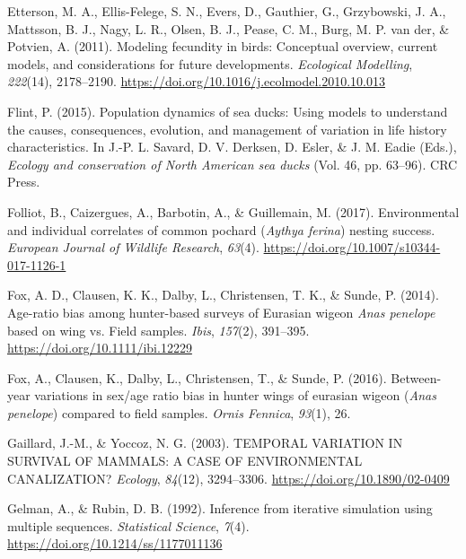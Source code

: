 \documentclass[
  english,
]{article}
\newlength{\cslhangindent}
\newlength{\cslentryspacingunit} %
\newenvironment{CSLReferences}[2] %
 {%
  \setlength{\parindent}{0pt}
  \ifodd #1
  \let\oldpar\par
  \def\par{\hangindent=\cslhangindent\oldpar}
  \fi
  \setlength{\parskip}{#2\cslentryspacingunit}
 }%
 {}
\begin{document}
\begin{CSLReferences}{1}{0}
\leavevmode{}%
Etterson, M. A., Ellis-Felege, S. N., Evers, D., Gauthier, G., Grzybowski, J. A., Mattsson, B. J., Nagy, L. R., Olsen, B. J., Pease, C. M., Burg, M. P. van der, \& Potvien, A. (2011). Modeling fecundity in birds: Conceptual overview, current models, and considerations for future developments. \emph{Ecological Modelling}, \emph{222}(14), 2178--2190. \url{https://doi.org/10.1016/j.ecolmodel.2010.10.013}

\leavevmode{}%
Flint, P. (2015). Population dynamics of sea ducks: Using models to understand the causes, consequences, evolution, and management of variation in life history characteristics. In J.-P. L. Savard, D. V. Derksen, D. Esler, \& J. M. Eadie (Eds.), \emph{Ecology and conservation of {N}orth {A}merican sea ducks} (Vol. 46, pp. 63--96). CRC Press.

\leavevmode{}%
Folliot, B., Caizergues, A., Barbotin, A., \& Guillemain, M. (2017). Environmental and individual correlates of common pochard (\emph{{A}ythya ferina}) nesting success. \emph{European Journal of Wildlife Research}, \emph{63}(4). \url{https://doi.org/10.1007/s10344-017-1126-1}

\leavevmode{}%
Fox, A. D., Clausen, K. K., Dalby, L., Christensen, T. K., \& Sunde, P. (2014). Age-ratio bias among hunter-based surveys of {E}urasian wigeon \emph{{A}nas penelope} based on wing vs. Field samples. \emph{Ibis}, \emph{157}(2), 391--395. \url{https://doi.org/10.1111/ibi.12229}

\leavevmode{}%
Fox, A., Clausen, K., Dalby, L., Christensen, T., \& Sunde, P. (2016). Between-year variations in sex/age ratio bias in hunter wings of eurasian wigeon (\emph{{A}nas penelope}) compared to field samples. \emph{Ornis Fennica}, \emph{93}(1), 26.

\leavevmode{}%
Gaillard, J.-M., \& Yoccoz, N. G. (2003). {TEMPORAL} {VARIATION} {IN} {SURVIVAL} {OF} {MAMMALS}: A {CASE} {OF} {ENVIRONMENTAL} {CANALIZATION}? \emph{Ecology}, \emph{84}(12), 3294--3306. \url{https://doi.org/10.1890/02-0409}

\leavevmode{}%
Gelman, A., \& Rubin, D. B. (1992). Inference from iterative simulation using multiple sequences. \emph{Statistical Science}, \emph{7}(4). \url{https://doi.org/10.1214/ss/1177011136}


\end{CSLReferences}
\end{document}

